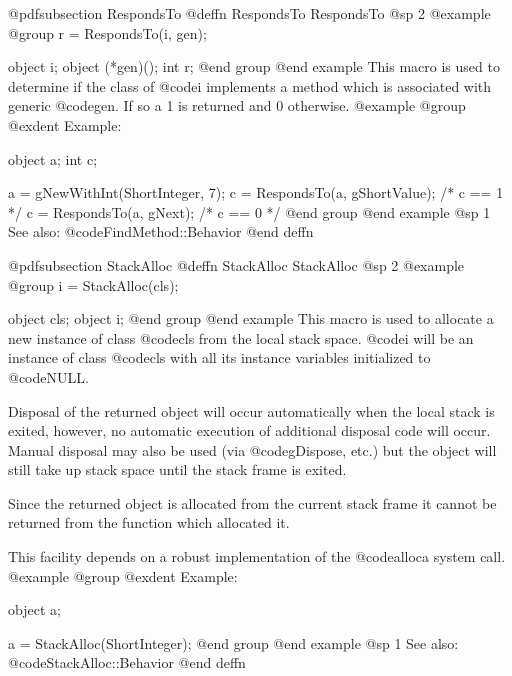 {{{{@pdfsubsection {RespondsTo}
@deffn {RespondsTo} RespondsTo
@sp 2
@example
@group
r = RespondsTo(i, gen);

object  i;
object  (*gen)();
int     r;
@end group
@end example
This macro is used to determine if the class of @code{i} implements a
method which is associated with generic @code{gen}.  If so a 1 is
returned and 0 otherwise.
@example
@group
@exdent Example:

object  a;
int     c;

a = gNewWithInt(ShortInteger, 7);
c = RespondsTo(a, gShortValue);  /* c == 1  */
c = RespondsTo(a, gNext);        /* c == 0  */
@end group
@end example
@sp 1
See also:  @code{FindMethod::Behavior}
@end deffn


















@pdfsubsection {StackAlloc}
@deffn {StackAlloc} StackAlloc
@sp 2
@example
@group
i = StackAlloc(cls);

object  cls;
object  i;
@end group
@end example
This macro is used to allocate a new instance of class @code{cls} from
the local stack space.  @code{i} will be an instance of class @code{cls}
with all its instance variables initialized to @code{NULL}.

Disposal of the returned object will occur automatically when the local
stack is exited, however, no automatic execution of additional disposal
code will occur.  Manual disposal may also be used (via @code{gDispose},
etc.) but the object will still take up stack space until the stack
frame is exited.

Since the returned object is allocated from the current stack frame
it cannot be returned from the function which allocated it.

This facility depends on a robust implementation of the @code{alloca}
system call.
@example
@group
@exdent Example:

object  a;

a = StackAlloc(ShortInteger);
@end group
@end example
@sp 1
See also:  @code{StackAlloc::Behavior}
@end deffn





























}}}}
